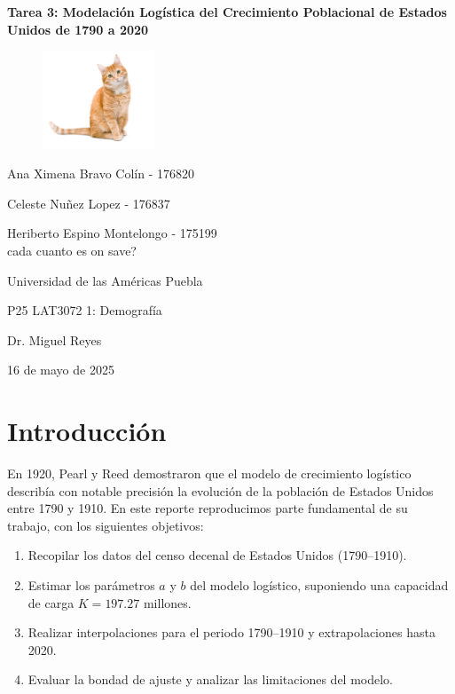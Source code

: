 \documentclass[12pt]{article}
\begin{document}
\begin{titlepage}
    \centering
    \vspace*{0.cm}
    \textbf{\Large Tarea 3: Modelación Logística del Crecimiento Poblacional de Estados Unidos de 1790 a 2020}\\
    \vspace{2cm}
    \begin{figure}[ht]
    \centering
    \includegraphics[width=0.3\textwidth]{cat.jpg}
    \end{figure}

    \vspace{1.5cm}

    Ana Ximena Bravo Colín - 176820

    
    Celeste Nuñez Lopez - 176837


    Heriberto Espino Montelongo - 175199\\[2cm]

    cada cuanto es on save?

    Universidad de las Américas Puebla

    
    P25 LAT3072 1: Demografía

    Dr. Miguel Reyes 
    
    16 de mayo de 2025
\end{titlepage}

\section{Introducción}


En 1920, Pearl y Reed demostraron que el modelo de crecimiento logístico describía con notable precisión la evolución de la población de Estados Unidos entre 1790 y 1910. En este reporte reproducimos parte fundamental de su trabajo, con los siguientes objetivos: 



\begin{enumerate}
\item Recopilar los datos del censo decenal de Estados Unidos (1790–1910).
\item Estimar los parámetros $a$ y $b$ del modelo logístico, suponiendo una capacidad de carga $K = 197.27$ millones.
\item Realizar interpolaciones para el periodo 1790–1910 y extrapolaciones hasta 2020.
\item Evaluar la bondad de ajuste y analizar las limitaciones del modelo.
\end{enumerate}
\end{document}
